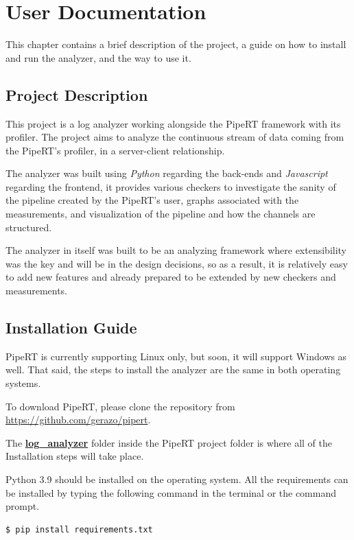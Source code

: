 \chapter{User Documentation} %
\label{ch:user}

This chapter contains a brief description of the project, a guide on how
to install and run the analyzer, and the way to use it.

\section{Project Description} %
This project is a log analyzer working alongside the PipeRT framework
with its profiler. The project aims to analyze the continuous stream of
data coming from the PipeRT's profiler, in a server-client relationship.

The analyzer was built using \textit{Python} regarding the back-ends and \textit{Javascript} regarding the frontend,
it provides various checkers to investigate the sanity of the pipeline created 
by the PipeRT's user, graphs associated with the measurements, and visualization
of the pipeline and how the channels are structured.

The analyzer in itself was built to be an analyzing framework where
extensibility was the key and will be in the design decisions, so as a result,
it is relatively easy to add new features and already prepared to be extended
by new checkers and measurements.


\section{Installation Guide}\label{sec:installiation_guide}
PipeRT is currently supporting Linux only, but soon,
it will support Windows as well. That said, the steps to install
the analyzer are the same in both operating systems.

To download PipeRT, please clone the repository from \url{https://github.com/gerazo/pipert}.

The \textbf{\url{log_analyzer}} folder inside the PipeRT project folder
is where all of the Installation steps will take place.

Python 3.9 should be installed on the operating system. All the
requirements can be installed by typing the following command in
the terminal or the command prompt.
\newline
\begin{lstlisting}[language=bash, caption={Install requirements},captionpos=b]
	$ pip install requirements.txt
\end{lstlisting}

